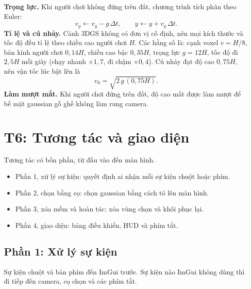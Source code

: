 \documentclass[9pt,twocolumn,a4paper]{extarticle}
\begin{document}
\textbf{Trọng lực.} Khi người chơi không đứng trên đất, chương trình tích phân theo Euler:
\begin{equation}
v_y \leftarrow v_y - g\,\Delta t,
\qquad
y \leftarrow y + v_y\,\Delta t.
\label{eq:euler}
\end{equation}
\textbf{Tỉ lệ và cú nhảy.} Cảnh 3DGS không có đơn vị cố định, nên mọi kích thước và tốc độ đều tỉ lệ theo chiều cao người chơi $H$. Các hằng số là: cạnh voxel $v=H/8$, bán kính người chơi $0{,}14H$, chiều cao bậc $0{,}35H$, trọng lực $g=12H$, tốc độ đi $2{,}5H$ mỗi giây (chạy nhanh $\times1{,}7$, đi chậm $\times0{,}4$). Cú nhảy đạt độ cao $0{,}75H$, nên vận tốc lúc bật lên là
\begin{equation}
v_0=\sqrt{2\,g\,(0{,}75H)}.
\label{eq:jump}
\end{equation}
\textbf{Làm mượt mắt.} Khi người chơi đứng trên đất, độ cao mắt được làm mượt để bề mặt gaussian gồ ghề không làm rung camera.

\par\noindent{}\par\vspace{3pt}

\section{T6: Tương tác và giao diện}
\label{chap:t6}
Tương tác có bốn phần, từ đầu vào đến màn hình.
\begin{itemize}\itemsep0pt
\item Phần 1, xử lý sự kiện: quyết định ai nhận mỗi sự kiện chuột hoặc phím.
\item Phần 2, chọn bằng cọ: chọn gaussian bằng cách tô lên màn hình.
\item Phần 3, xóa mềm và hoàn tác: xóa vùng chọn và khôi phục lại.
\item Phần 4, giao diện: bảng điều khiển, HUD và phím tắt.
\end{itemize}

\subsection{Phần 1: Xử lý sự kiện}
Sự kiện chuột và bàn phím đến ImGui trước. Sự kiện nào ImGui không dùng thì đi tiếp đến camera, cọ chọn và các phím tắt.
\end{document}
